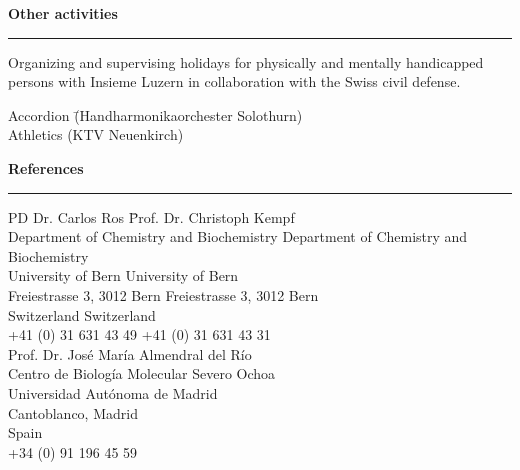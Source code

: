 \large
\textbf{Other activities}
\noindent\rule[3mm]{\linewidth}{1pt}

\normalsize
\vspace{-0.25cm}
Organizing and supervising holidays for physically and mentally handicapped persons with Insieme Luzern in collaboration with the Swiss civil defense.
\vspace{-0.1 cm}
\begin{tabbing}
Accordion \=(Handharmonikaorchester Solothurn) \\[0.15 cm]
Athletics \>(KTV Neuenkirch) 
\end{tabbing}



\vspace{0.475 cm}
\large
\textbf{References}
\noindent\rule[3mm]{\linewidth}{1pt}

 
\vspace{-0.5 cm}
\begin{tabbing}
PD Dr. Carlos Ros \hspace{5.4 cm} \= Prof. Dr. Christoph Kempf \\
Department of Chemistry and Biochemistry \> Department of Chemistry and Biochemistry \\
University of Bern \> University of Bern \\
Freiestrasse 3, 3012 Bern \> Freiestrasse 3, 3012 Bern \\
Switzerland \> Switzerland \\ [0.1 cm]
+41 (0) 31 631 43 49 \> +41 (0) 31 631 43 31\\ [0.55 cm]

Prof. Dr. José María Almendral del Río \\
Centro de Biología Molecular Severo Ochoa \\
Universidad Autónoma de Madrid \\
Cantoblanco,  Madrid \\
Spain \\ [0.1 cm]
+34 (0) 91 196 45 59






\end{tabbing}

\restoregeometry
{}
